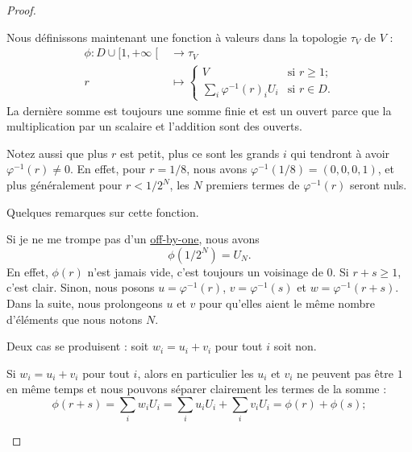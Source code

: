 \begin{proof}
\begin{subproof}
		Nous définissons maintenant une fonction à valeurs dans la topologie \( \tau_V\) de \( V\) :
		\begin{equation}
			\begin{aligned}
				\phi\colon D\cup\mathopen[ 1 , +\infty \mathclose[ & \to \tau_V \\
				r                                                  & \mapsto
				\begin{cases}
					V                          & \text{si } r \geq 1; \\
					\sum_i\varphi^{-1}(r)_iU_i & \text{si } r\in D.
				\end{cases}
			\end{aligned}
		\end{equation}
		La dernière somme est toujours une somme finie et est un ouvert parce que la multiplication par un scalaire et l'addition sont des ouverts.

		Notez aussi que plus \( r\) est petit, plus ce sont les grands \( i\) qui tendront à avoir \( \varphi^{-1}(r)\neq 0\). En effet, pour \( r=1/8\), nous avons \( \varphi^{-1}(1/8)=(0,0,0,1)\), et plus généralement pour \( r<1/2^N\), les \( N\) premiers termes de \( \varphi^{-1}(r)\) seront nuls.

		Quelques remarques sur cette fonction.
		\begin{subproof}
			 Si je ne me trompe pas d'un \href{ https://fr.wikipedia.org/wiki/Erreur_off-by-one }{off-by-one}, nous avons
			\begin{equation}
				\phi(1/2^N)=U_N.
			\end{equation}
			En effet, \(\phi(r)\) n'est jamais vide, c'est toujours un voisinage de \(0\).
			Si \(r + s \geq 1 \), c'est clair. Sinon, nous posons \( u=\varphi^{-1}(r)\), \( v=\varphi^{-1}(s)\) et \( w=\varphi^{-1}(r+s)\). Dans la suite, nous prolongeons \( u\) et \( v\) pour qu'elles aient le même nombre d'éléments que nous notons \( N\).

			Deux cas se produisent : soit \( w_i=u_i+v_i\) pour tout \( i\) soit non.

			\begin{subproof}
				Si \( w_i=u_i+v_i\) pour tout \( i\), alors en particulier les \( u_i\) et \( v_i\) ne peuvent pas être \( 1\) en même temps et nous pouvons séparer clairement les termes de la somme :
				\begin{equation}
					\phi(r+s) = \sum_i w_i U_i = \sum_i u_i U_i + \sum_i v_i U_i = \phi(r) + \phi(s);
				\end{equation}


\end{subproof}
\end{subproof}
\end{subproof}
\end{proof}
